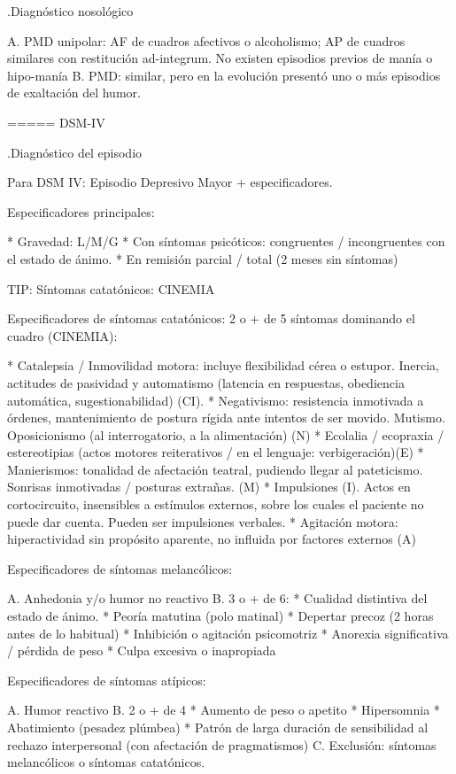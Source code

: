 .Diagnóstico nosológico

A. PMD unipolar: AF de cuadros afectivos o alcoholismo; AP de cuadros similares con restitución ad-integrum. No existen episodios previos de manía o hipo-manía
B. PMD: similar, pero en la evolución presentó uno o más episodios de exaltación del humor.

===== DSM-IV

.Diagnóstico del episodio

Para DSM IV: Episodio Depresivo Mayor + especificadores.

Especificadores principales:

* Gravedad: L/M/G
* Con síntomas psicóticos: congruentes / incongruentes con el estado de ánimo.
* En remisión parcial / total (2 meses sin síntomas)

TIP: Síntomas catatónicos: CINEMIA

Especificadores de síntomas catatónicos: 2 o + de 5 síntomas dominando el cuadro (CINEMIA):

* Catalepsia / Inmovilidad motora: incluye flexibilidad cérea o estupor. Inercia, actitudes de pasividad y automatismo (latencia en respuestas, obediencia automática, sugestionabilidad) (CI).
* Negativismo: resistencia inmotivada a órdenes, mantenimiento de postura rígida ante intentos de ser movido. Mutismo. Oposicionismo (al interrogatorio, a la alimentación) (N)
* Ecolalia / ecopraxia / estereotipias (actos motores reiterativos / en el lenguaje: verbigeración)(E)
* Manierismos: tonalidad de afectación teatral, pudiendo llegar al pateticismo. Sonrisas inmotivadas / posturas extrañas. (M)
* Impulsiones (I). Actos en cortocircuito, insensibles a estímulos externos, sobre los cuales el paciente no puede dar cuenta. Pueden ser impulsiones verbales.
* Agitación motora: hiperactividad sin propósito aparente, no influida por factores externos (A)

Especificadores de síntomas melancólicos:

A. Anhedonia y/o humor no reactivo
B. 3 o + de 6:
* Cualidad distintiva del estado de ánimo.
* Peoría matutina (polo matinal)
* Depertar precoz (2 horas antes de lo habitual)
* Inhibición o agitación psicomotriz
* Anorexia significativa / pérdida de peso
* Culpa excesiva o inapropiada

Especificadores de síntomas atípicos:

A. Humor reactivo
B. 2 o + de 4
* Aumento de peso o apetito
* Hipersomnia
* Abatimiento (pesadez plúmbea)
* Patrón de larga duración de sensibilidad al rechazo interpersonal (con afectación de pragmatismos)
C. Exclusión: síntomas melancólicos o síntomas catatónicos.

